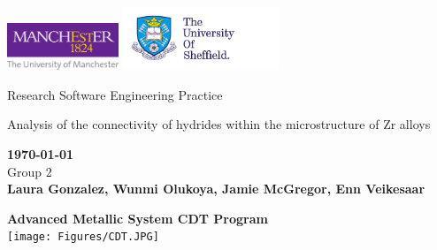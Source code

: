 \thispagestyle{empty} 
\begin{titlepage}
    \centering
    \includegraphics[width=0.25\textwidth]{Figures/Logos/uom_logo.pdf}
    \hspace{170}
    \includegraphics[width=0.35\textwidth]{Figures/Logos/Sheffield.pdf}
    \begin{center}
       \vspace*{4cm}
       {\LARGE Research Software Engineering Practice}
       \vspace{3cm}
    \begin{large}   
    

         
         \vspace{0.5cm}

        {\LARGE Analysis of the connectivity of hydrides within the microstructure of Zr alloys} \\

       \vspace{1.5cm}
        
        {\bf \today} \\
                
        
       \vspace{3 cm}
        Group 2 \\
       \textbf{Laura Gonzalez,
       Wunmi Olukoya,
       Jamie McGregor, 
       Enn Veikesaar }\\

       \vfill
       \centering
       
        {\bf \large Advanced Metallic System CDT Program}\\
          
        \texttt{[image: Figures/CDT.JPG]}
    
    \end{large}  
   \end{center}
\end{titlepage}